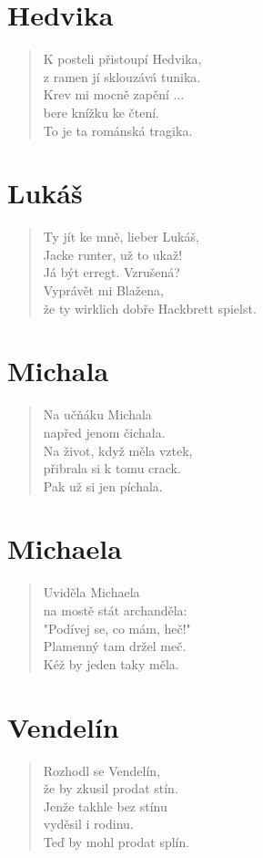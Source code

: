 \section*{Hedvika}
\begin{verse}
K posteli přistoupí Hedvika,\\
z ramen jí sklouzává tunika.\\
Krev mi mocně zapění ...\\
bere knížku ke čtení.\\
To je ta románská tragika.
\end{verse}

\section*{Lukáš}
\begin{verse}
Ty jít ke mně, lieber Lukáš,\\
Jacke runter, už to ukaž!\\
Já být erregt. Vzrušená?\\
Vyprávět mi Blažena,\\
že ty wirklich dobře Hackbrett spielst.
\end{verse}

\section*{Michala}
\begin{verse}
Na učňáku Michala\\
napřed jenom čichala.\\
Na život, když měla vztek,\\
přibrala si k tomu crack.\\
Pak už si jen píchala.
\end{verse}

\section*{Michaela}
\begin{verse}
Uviděla Michaela\\
na mostě stát archanděla:\\
"Podívej se, co mám, heč!"\\
Plamenný tam držel meč.\\
Kéž by jeden taky měla.
\end{verse}

\section*{Vendelín}
\begin{verse}
Rozhodl se Vendelín,\\
že by zkusil prodat stín.\\
Jenže takhle bez stínu\\
vyděsil i rodinu.\\
Teď by mohl prodat splín.
\end{verse}

